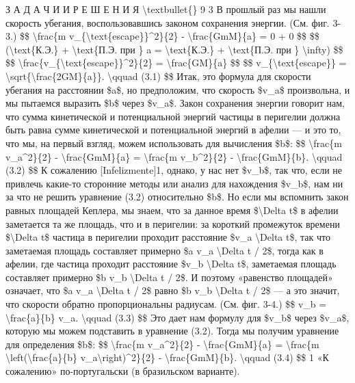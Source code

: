 \documentclass[10pt,oneside]{article}
\begin{document}
З А Д А Ч И  И  Р Е Ш Е Н И Я \textbackslash{}textbullet\{\} 9 3 В прошлый раз мы нашли скорость убегания, воспользовавшись законом сохранения энергии. (См. фиг. 3-3.) \$\$ \textbackslash{}frac\{m v\_\{\textbackslash{}text\{escape\}\}\textasciicircum{}2\}\{2\} - \textbackslash{}frac\{GmM\}\{a\} = 0 + 0 \$\$ \$\$ (\textbackslash{}text\{К.Э.\} + \textbackslash{}text\{П.Э. при \} a = \textbackslash{}text\{К.Э.\} + \textbackslash{}text\{П.Э. при \} \textbackslash{}infty) \$\$ \$\$ \textbackslash{}frac\{v\_\{\textbackslash{}text\{escape\}\}\textasciicircum{}2\}\{2\} = \textbackslash{}frac\{GM\}\{a\} \$\$ \$\$ v\_\{\textbackslash{}text\{escape\}\} = \textbackslash{}sqrt\{\textbackslash{}frac\{2GM\}\{a\}\}. \textbackslash{}qquad (3.1) \$\$ Итак, это формула для скорости убегания на расстоянии \$a\$, но предположим, что скорость \$v\_a\$ произвольна, и мы пытаемся выразить \$b\$ через \$v\_a\$. Закон сохранения энергии говорит нам, что сумма кинетической и потенциальной энергий частицы в перигелии должна быть равна сумме кинетической и потенциальной энергий в афелии --- и это то, что мы, на первый взгляд, можем использовать для вычисления \$b\$: \$\$ \textbackslash{}frac\{m v\_a\textasciicircum{}2\}\{2\} - \textbackslash{}frac\{GmM\}\{a\} = \textbackslash{}frac\{m v\_b\textasciicircum{}2\}\{2\} - \textbackslash{}frac\{GmM\}\{b\}. \textbackslash{}qquad (3.2) \$\$ К сожалению [Infelizmente]1, однако, у нас нет \$v\_b\$, так что, если не привлечь какие-то сторонние методы или анализ для нахождения \$v\_b\$, нам ни за что не решить уравнение (3.2) относительно \$b\$. Но если мы вспомнить закон равных площадей Кеплера, мы знаем, что за данное время \$\textbackslash{}Delta t\$ в афелии заметается та же площадь, что и в перигелии: за короткий промежуток времени \$\textbackslash{}Delta t\$ частица в перигелии проходит расстояние \$v\_a \textbackslash{}Delta t\$, так что заметаемая площадь составляет примерно \$a v\_a \textbackslash{}Delta t / 2\$, тогда как в афелии, где частица проходит расстояние \$v\_b \textbackslash{}Delta t\$, заметаемая площадь составляет примерно \$b v\_b \textbackslash{}Delta t / 2\$. И поэтому «равенство площадей» означает, что \$a v\_a \textbackslash{}Delta t / 2\$ равно \$b v\_b \textbackslash{}Delta t / 2\$ --- а это значит, что скорости обратно пропорциональны радиусам. (См. фиг. 3-4.) \$\$ v\_b = \textbackslash{}frac\{a\}\{b\} v\_a. \textbackslash{}qquad (3.3) \$\$ Это дает нам формулу для \$v\_b\$ через \$v\_a\$, которую мы можем подставить в уравнение (3.2). Тогда мы получим уравнение для определения \$b\$: \$\$ \textbackslash{}frac\{m v\_a\textasciicircum{}2\}\{2\} - \textbackslash{}frac\{GmM\}\{a\} = \textbackslash{}frac\{m \textbackslash{}left(\textbackslash{}frac\{a\}\{b\} v\_a\textbackslash{}right)\textasciicircum{}2\}\{2\} - \textbackslash{}frac\{GmM\}\{b\}. \textbackslash{}qquad (3.4) \$\$ 1 «К сожалению» по-португальски (в бразильском варианте).\par
\end{document}
